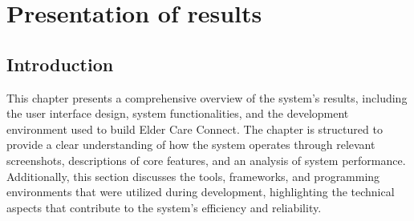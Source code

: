 \chapter{Presentation of results}
\section{Introduction}
This chapter presents a comprehensive overview of the system's results, including the user interface design, system functionalities, and the development environment used to build Elder Care Connect. The chapter is structured to provide a clear understanding of how the system operates through relevant screenshots, descriptions of core features, and an analysis of system performance. Additionally, this section discusses the tools, frameworks, and programming environments that were utilized during development, highlighting the technical aspects that contribute to the system’s efficiency and reliability.
